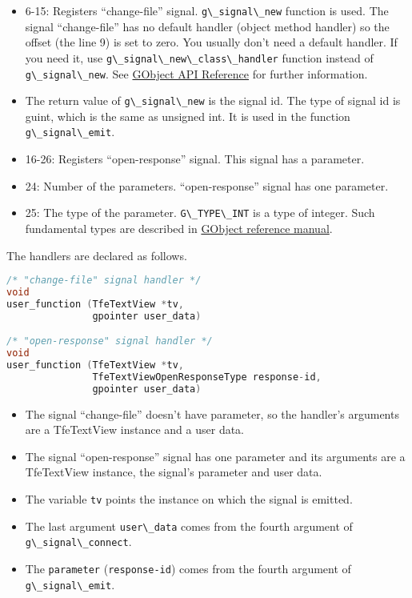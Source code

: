 \begin{itemize}
\tightlist
\item
  6-15: Registers ``change-file'' signal.
  \passthrough{\lstinline!g\_signal\_new!} function is used. The signal
  ``change-file'' has no default handler (object method handler) so the
  offset (the line 9) is set to zero. You usually don't need a default
  handler. If you need it, use
  \passthrough{\lstinline!g\_signal\_new\_class\_handler!} function
  instead of \passthrough{\lstinline!g\_signal\_new!}. See
  \href{https://docs.gtk.org/gobject/func.signal_new_class_handler.html}{GObject
  API Reference} for further information.
\item
  The return value of \passthrough{\lstinline!g\_signal\_new!} is the
  signal id. The type of signal id is guint, which is the same as
  unsigned int. It is used in the function
  \passthrough{\lstinline!g\_signal\_emit!}.
\item
  16-26: Registers ``open-response'' signal. This signal has a
  parameter.
\item
  24: Number of the parameters. ``open-response'' signal has one
  parameter.
\item
  25: The type of the parameter. \passthrough{\lstinline!G\_TYPE\_INT!}
  is a type of integer. Such fundamental types are described in
  \href{https://developer-old.gnome.org/gobject/stable/gobject-Type-Information.html}{GObject
  reference manual}.
\end{itemize}

The handlers are declared as follows.

\begin{lstlisting}[language=C]
/* "change-file" signal handler */
void
user_function (TfeTextView *tv,
               gpointer user_data)

/* "open-response" signal handler */
void
user_function (TfeTextView *tv,
               TfeTextViewOpenResponseType response-id,
               gpointer user_data)
\end{lstlisting}

\begin{itemize}
\tightlist
\item
  The signal ``change-file'' doesn't have parameter, so the handler's
  arguments are a TfeTextView instance and a user data.
\item
  The signal ``open-response'' signal has one parameter and its
  arguments are a TfeTextView instance, the signal's parameter and user
  data.
\item
  The variable \passthrough{\lstinline!tv!} points the instance on which
  the signal is emitted.
\item
  The last argument \passthrough{\lstinline!user\_data!} comes from the
  fourth argument of \passthrough{\lstinline!g\_signal\_connect!}.
\item
  The \passthrough{\lstinline!parameter!}
  (\passthrough{\lstinline!response-id!}) comes from the fourth argument
  of \passthrough{\lstinline!g\_signal\_emit!}.
\end{itemize}

